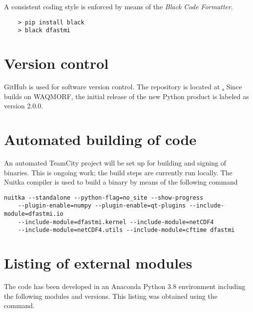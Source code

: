 A consistent coding style is enforced by means of the \emph{Black Code Formatter}.

\begin{Verbatim}
    > pip install black
    > black dfastmi
\end{Verbatim}

\section{Version control}

GitHub is used for software version control.
The repository is located at \href{https://github.com/Deltares/D-FAST_Morphological_Impact}.
Since \dfastmi builds on WAQMORF, the initial release of the new Python product is labeled as version 2.0.0.

\section{Automated building of code}

An automated TeamCity project will be set up for building and signing of binaries.
This is ongoing work; the build steps are currently run locally.
The Nuitka compiler is used to build a binary by means of the following command

\begin{Verbatim}
nuitka --standalone --python-flag=no_site --show-progress
    --plugin-enable=numpy --plugin-enable=qt-plugins --include-module=dfastmi.io
    --include-module=dfastmi.kernel --include-module=netCDF4
    --include-module=netCDF4.utils --include-module=cftime dfastmi
\end{Verbatim}

\section{Listing of external modules}

The code has been developed in an Anaconda Python 3.8 environment including the following modules and versions.
This listing was obtained using the  command.


